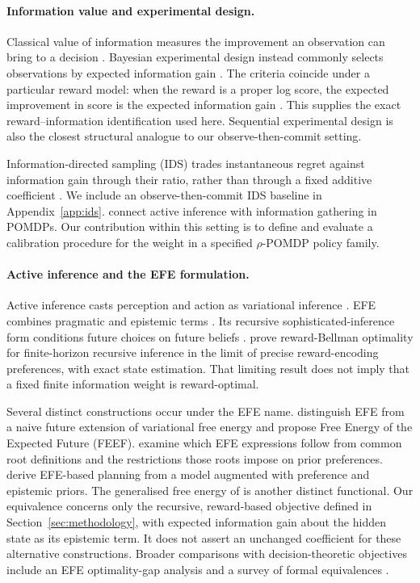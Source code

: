 \paragraph{Information value and experimental design.}
Classical value of information measures the improvement an observation can bring to a decision \citep{howard1966}. Bayesian experimental design instead commonly selects observations by expected information gain \citep{lindley1956,foster2021dad}. The criteria coincide under a particular reward model: when the reward is a proper log score, the expected improvement in score is the expected information gain \citep{bernardo1979}. This supplies the exact reward--information identification used here. Sequential experimental design is also the closest structural analogue to our observe-then-commit setting.

Information-directed sampling (IDS) trades instantaneous regret against information gain through their ratio, rather than through a fixed additive coefficient \citep{russo2014}. We include an observe-then-commit IDS baseline in Appendix~\ref{app:ids}. \citet{walraven2024} connect active inference with information gathering in POMDPs. Our contribution within this setting is to define and evaluate a calibration procedure for the weight in a specified $\rho$-POMDP policy family.

\paragraph{Active inference and the EFE formulation.}
Active inference casts perception and action as variational inference \citep{friston2010,parr2022}. EFE combines pragmatic and epistemic terms \citep{friston2015,parr2019,dacosta2020}. Its recursive sophisticated-inference form conditions future choices on future beliefs \citep{friston2021}. \citet{dacosta2020b} prove reward-Bellman optimality for finite-horizon recursive inference in the limit of precise reward-encoding preferences, with exact state estimation. That limiting result does not imply that a fixed finite information weight is reward-optimal.

Several distinct constructions occur under the EFE name. \citet{millidge2021} distinguish EFE from a naive future extension of variational free energy and propose Free Energy of the Expected Future (FEEF). \citet{champion2024} examine which EFE expressions follow from common root definitions and the restrictions those roots impose on prior preferences. \citet{devries2025} derive EFE-based planning from a model augmented with preference and epistemic priors. The generalised free energy of \citet{parr2019} is another distinct functional. Our equivalence concerns only the recursive, reward-based objective defined in Section~\ref{sec:methodology}, with expected information gain about the hidden state as its epistemic term. It does not assert an unchanged coefficient for these alternative constructions. Broader comparisons with decision-theoretic objectives include an EFE optimality-gap analysis \citep{wei2024voi} and a survey of formal equivalences \citep{sweeney2026equivalences}.

